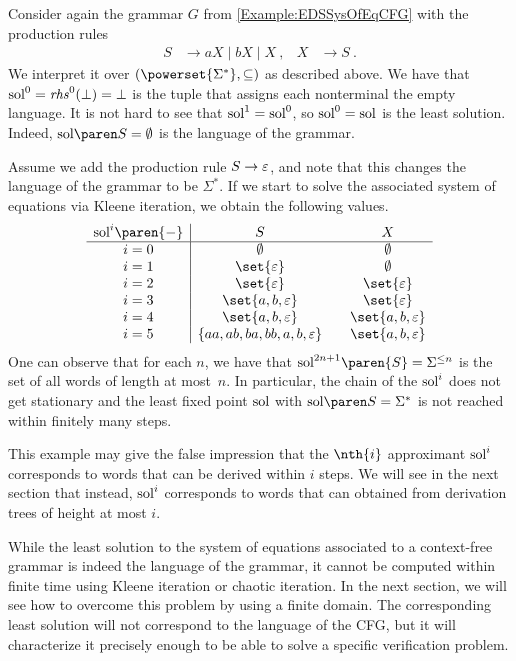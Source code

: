 \documentclass[../../diss.tex]{subfiles}
\begin{document}
\begin{example}%
    Consider again the grammar $G$ from \cref{Example:EDSSysOfEqCFG} with the production rules
    \begin{align*}
        S &\to aX \mid bX \mid X
        \ ,
        &
        X &\to S
        \ .
    \end{align*}
    We interpret it over $(\powerset{\Sigma^*},\subseteq)$ as described above.
    We have that $\text{sol}^{0} = \mathit{rhs}^0(\bot) = \bot$ is the tuple that assigns each nonterminal the empty language.
    It is not hard to see that $\text{sol}^{1} = \text{sol}^{0}$, so $\soli{0} = \sol$ is the least solution.
    Indeed, $\sol{S} = \emptyset$ is the language of the grammar.

    Assume we add the production rule $S \to \varepsilon$, and note that this changes the language of the grammar to be $\Sigma^*$.
    If we start to solve the associated system of equations via Kleene iteration, we obtain the following values.
%
    \[
        \begin{array}{c|c@{\hskip 2em}c}
            \soli{i}\paren{-} & S & X
            \\
            \hline
            i = 0 & \emptyset & \emptyset
            \\
            i = 1 & \set{\eps} & \emptyset
            \\
            i = 2 & \set{\eps} & \set{\eps}
            \\
            i = 3 & \set{a,b,\eps} & \set{\eps}
            \\
            i = 4 & \set{a,b,\eps} & \set{a,b,\eps}
            \\
            i = 5 & \{aa,ab,ba, bb,a,b,\eps \} & \set{a,b,\eps}
        \end{array}
    \]
%
    One can observe that for each $n$, we have that $\soli{2n+1}\paren{S} = \Sigma^{\leq n}$ is the set of all words of length at most~$n$.
    In particular, the chain of the $\text{sol}^{i}$ does not get stationary and the least fixed point $\sol$ with $\sol{S} = \Sigma^*$ is not reached within finitely many steps.

    This example may give the false impression that the $\nth{i}$ approximant $\text{sol}^{i}$ corresponds to words that can be derived within $i$ steps.
    We will see in the next section that instead, $\text{sol}^{i}$ corresponds to words that can obtained from derivation trees of height at most $i$.
\end{example}

While the least solution to the system of equations associated to a context-free grammar is indeed the language of the grammar, it cannot be computed within finite time using Kleene iteration or chaotic iteration.
In the next section, we will see how to overcome this problem by using a finite domain.
The corresponding least solution will not correspond to the language of the CFG, but it will characterize it precisely enough to be able to solve a specific verification problem.
\end{document}
